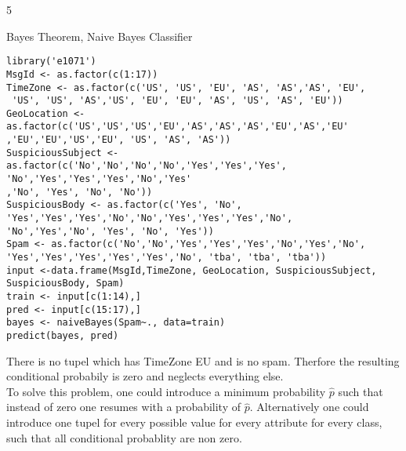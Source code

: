 \documentclass{article}
\begin{document}
\begin{ukon-infie}[29.11.17]{5}
\begin{exercise}[p=10]{Bayes Theorem, Naive Bayes Classifier}
{       }
       
       \question{}
       {
       
       }
       \begin{verbatim}
library('e1071')
MsgId <- as.factor(c(1:17))
TimeZone <- as.factor(c('US', 'US', 'EU', 'AS', 'AS','AS', 'EU',
 'US', 'US', 'AS','US', 'EU', 'EU', 'AS', 'US', 'AS', 'EU'))
GeoLocation <- as.factor(c('US','US','US','EU','AS','AS','AS','EU','AS','EU'
,'EU','EU','US','EU', 'US', 'AS', 'AS'))
SuspiciousSubject <- as.factor(c('No','No','No','No','Yes','Yes','Yes',
'No','Yes','Yes','Yes','No','Yes'
,'No', 'Yes', 'No', 'No'))
SuspiciousBody <- as.factor(c('Yes', 'No', 'Yes','Yes','Yes','No','No','Yes','Yes','Yes','No',
'No','Yes','No', 'Yes', 'No', 'Yes'))
Spam <- as.factor(c('No','No','Yes','Yes','Yes','No','Yes','No',
'Yes','Yes','Yes','Yes','Yes','No', 'tba', 'tba', 'tba'))
input <-data.frame(MsgId,TimeZone, GeoLocation, SuspiciousSubject, SuspiciousBody, Spam)
train <- input[c(1:14),]
pred <- input[c(15:17),]
bayes <- naiveBayes(Spam~., data=train)
predict(bayes, pred)
       \end{verbatim}
       \question{}
       {
       There is no tupel which has TimeZone EU and is no spam. Therfore the resulting conditional probabily is zero and neglects everything else.\\
       To solve this problem, one could introduce a minimum probability $\hat{p}$ such that instead of zero one resumes with a probability of $\hat{p}$. Alternatively one could introduce one tupel for every possible value for every attribute for every class, such that all conditional probablity are non zero.
       }
		\end{exercise}
		

\end{ukon-infie}
\end{document}
